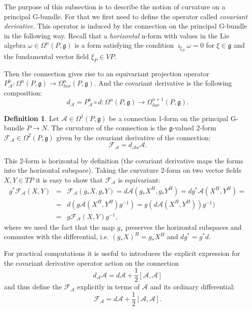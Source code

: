 \documentclass[11pt]{report}
\theoremstyle{plain}
\theoremstyle{definition}
\newtheorem{defn}[thm]{Definition}
\theoremstyle{remark}
\theoremstyle{remark}
\numberwithin{equation}{section}
\begin{document}
The purpose of this subsection is to describe the notion of curvature on a principal G-bundle. For that we first need to define the operator called \textit{covariant derivative}. 
This operator is induced by the connection on the principal G-bundle in the following way. Recall that a \textit{horizontal} n-form with values in the Lie algebra $\omega\in \Omega^n(P,\mathfrak{g})$ is a form satisfying the condition $\imath_{\xi_P} \omega = 0$ for $\xi \in \mathfrak{g}$ and the fundamental vector field $\xi_P \in VP$. 

Then the connection gives rise to an equivariant projection operator $P^h_{\mathcal{A}}: \Omega^n(P,\mathfrak{g}) \to \Omega^n_{hor}(P,\mathfrak{g})$. And the covariant derivative is the following composition:
\begin{equation}
d_{\mathcal{A}} = P^h_{\mathcal{A}}\circ d : \Omega^n(P,\mathfrak{g}) \to \Omega^{n+1}_{hor}(P,\mathfrak{g}).
\end{equation}


\begin{defn}
Let $\mathcal{A} \in \Omega^1(P,\mathfrak{g})$ be a connection 1-form on the principal G-bundle $P\to N$. The curvature of the connection is the $\mathfrak{g}$-valued 2-form $\mathcal{F}_{\mathcal{A}}\in \Omega^2(P,\mathfrak{g})$ given by the covariant derivative of the connection:
$$\mathcal{F}_{\mathcal{A}} = d_{\mathcal{A}a} \mathcal{A}.$$
\end{defn}
This 2-form is horizontal by definition (the covariant derivative maps the forms into the horizontal subspace). Taking the curvature 2-form on two vector fields $X, Y \in TP$ it is easy to show that $\mathcal{F}_{\mathcal{A}}$ is equivariant:
%
\begin{equation}
\begin{array}{lcl}
g^*\mathcal{F}_{\mathcal{A}}(X,Y)& = & \mathcal{F}_{\mathcal{A}}(g_*X, g_*Y) = d\mathcal{A} (g_*X^H, g_*Y^H) = d g^*\mathcal{A} (X^H, Y^H) =    \\
&=& d(g\mathcal{A} (X^H, Y^H) g^{-1}) = g(d\mathcal{A} (X^H, Y^H)) g^{-1})\\
&=& g\mathcal{F}_{\mathcal{A}}(X,Y)g^{-1},
\end{array}
\end{equation}
where we used the fact that the map $g_*$ preserves the horizontal subspaces and commutes with the differential, i.e. $(g_*X)^H=g_*X^H$ and $d g^* = g^*d$. 

For practical computations it is useful to introduces the explicit expression for the covariant derivative operator action on the connection
\begin{equation}
d_\mathcal{A} \mathcal{A} = d\mathcal{A} +\frac{1}{2}[\mathcal{A}, \mathcal{A}]
\end{equation}
 and thus define the $\mathcal{F}_{\mathcal{A}}$ explicitly in terms of $\mathcal{A}$ and its ordinary differential:
\begin{equation}
\mathcal{F}_{\mathcal{A}} = d\mathcal{A} +\frac{1}{2}[\mathcal{A}, \mathcal{A}].
\end{equation}
\end{document}
